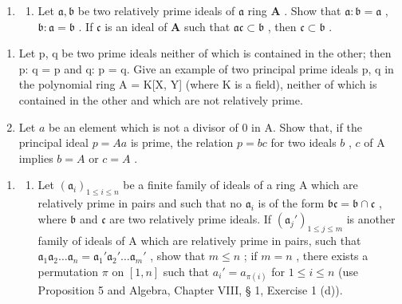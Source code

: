 \begin{enumerate}
\def\labelenumi{\arabic{enumi}.}
\setcounter{enumi}{7}
\tightlist
\item
  \begin{enumerate}
  \def\labelenumii{(\alph{enumii})}
  \tightlist
  \item
    Let \(\mathfrak{a}, \mathfrak{b}\) be two relatively prime ideals of \(\mathfrak{a}\) ring \(\mathbf{A}\) . Show that \(\mathfrak{a}: \mathfrak{b} = \mathfrak{a}\) , \(\mathfrak{b}: \mathfrak{a} = \mathfrak{b}\) . If \(\mathfrak{c}\) is an ideal of \(\mathbf{A}\) such that \(\mathfrak{ac} \subset \mathfrak{b}\) , then \(\mathfrak{c} \subset \mathfrak{b}\) .
  \end{enumerate}
\end{enumerate}

\begin{enumerate}
\def\labelenumi{(\alph{enumi})}
\setcounter{enumi}{1}
\item
  Let p, q be two prime ideals neither of which is contained in the other; then p: q = p and q: p = q. Give an example of two principal prime ideals p, q in the polynomial ring A = K{[}X, Y{]} (where K is a field), neither of which is contained in the other and which are not relatively prime.
\item
  Let \(a\) be an element which is not a divisor of 0 in A. Show that, if the principal ideal \(p = Aa\) is prime, the relation \(p = bc\) for two ideals \(b\) , \(c\) of A implies \(b = A\) or \(c = A\) .
\end{enumerate}

\begin{enumerate}
\def\labelenumi{\arabic{enumi}.}
\setcounter{enumi}{8}
\tightlist
\item
  \begin{enumerate}
  \def\labelenumii{(\alph{enumii})}
  \tightlist
  \item
    Let \((\mathfrak{a}_i)_{1 \leqslant i \leqslant n}\) be a finite family of ideals of a ring A which are relatively prime in pairs and such that no \(\mathfrak{a}_i\) is of the form \(\mathfrak{bc} = \mathfrak{b} \cap \mathfrak{c}\) , where \(\mathfrak{b}\) and \(\mathfrak{c}\) are two relatively prime ideals. If \((\mathfrak{a}_j')_{1 \leqslant j \leqslant m}\) is another family of ideals of A which are relatively prime in pairs, such that \(\mathfrak{a}_1\mathfrak{a}_2 \ldots \mathfrak{a}_n = \mathfrak{a}_1'\mathfrak{a}_2' \ldots \mathfrak{a}_m'\) , show that \(m \leqslant n\) ; if \(m = n\) , there exists a permutation \(\pi\) on \([1, n]\) such that \(a_i' = a_{\pi(i)}\) for \(1 \leqslant i \leqslant n\) (use Proposition 5 and Algebra, Chapter VIII, § 1, Exercise 1 (d)).
  \end{enumerate}
\end{enumerate}

